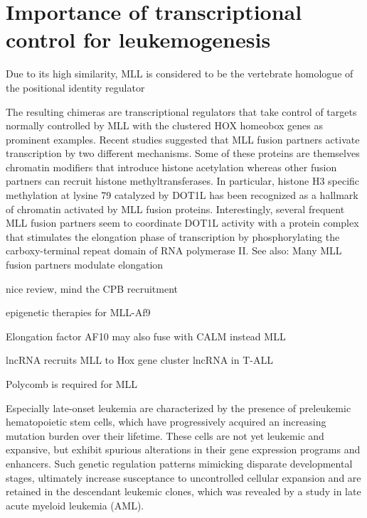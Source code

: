 \section{Importance of transcriptional control for leukemogenesis}

Due to its high similarity, MLL is considered to be the vertebrate homologue of the  positional identity regulator \cite{Gu1992,Tkachuk1992,Djabali1992}

The resulting chimeras are transcriptional regulators that take control of targets normally controlled by MLL with the clustered HOX homeobox genes as prominent examples. Recent studies suggested that MLL fusion partners activate transcription by two different mechanisms. Some of these proteins are themselves chromatin modifiers that introduce histone acetylation whereas other fusion partners can recruit histone methyltransferases. In particular, histone H3 specific methylation at lysine 79 catalyzed by DOT1L has been recognized as a hallmark of chromatin activated by MLL fusion proteins. Interestingly, several frequent MLL fusion partners seem to coordinate DOT1L activity with a protein complex that stimulates the elongation phase of transcription by phosphorylating the carboxy-terminal repeat domain of RNA polymerase II.\cite{Slany2009}
See also: Many MLL fusion partners modulate elongation \cite{Slany2016}

nice review, mind the CPB recruitment \cite{Muntean2012}

epigenetic therapies for MLL-Af9 \cite{Neff2013}

Elongation factor AF10 may also fuse with CALM instead MLL\cite{Dreyling1998}

lncRNA recruits MLL to Hox gene cluster \cite{Yang2014}
lncRNA in T-ALL\cite{ThiNgoc2018}

\cite{Huang2014} Polycomb is required for MLL

Especially late-onset leukemia are characterized by the presence of preleukemic hematopoietic stem cells, which have progressively acquired an increasing mutation burden over their lifetime. These cells are not yet leukemic and expansive, but exhibit spurious alterations in their gene expression programs and enhancers. Such genetic regulation patterns mimicking disparate developmental stages, ultimately increase susceptance to uncontrolled cellular expansion and are retained in the descendant leukemic clones, which was revealed by a study in late acute myeloid leukemia (AML)\cite{Corces2016}. 

